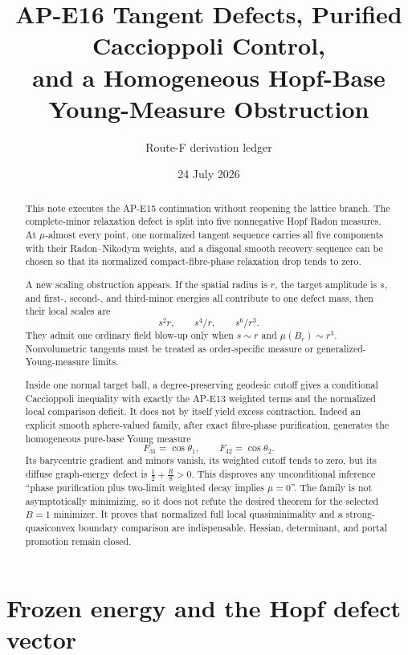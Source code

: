 \documentclass[10pt]{article}
\title{AP-E16 Tangent Defects, Purified Caccioppoli Control,\\
and a Homogeneous Hopf-Base Young-Measure Obstruction}
\author{Route-F derivation ledger}
\date{24 July 2026}
\begin{document}
\maketitle

\begin{abstract}
This note executes the AP-E15 continuation without reopening the lattice
branch.  The complete-minor relaxation defect is split into five nonnegative
Hopf Radon measures.  At $\mu$-almost every point, one normalized tangent
sequence carries all five components with their Radon--Nikodym weights, and a
diagonal smooth recovery sequence can be chosen so that its normalized
compact-fibre-phase relaxation drop tends to zero.

A new scaling obstruction appears.  If the spatial radius is $r$, the target
amplitude is $s$, and first-, second-, and third-minor energies all contribute
to one defect mass, then their local scales are
\[
 s^2r,\qquad s^4/r,\qquad s^6/r^3.
\]
They admit one ordinary field blow-up only when $s\sim r$ and
$\mu(B_r)\sim r^3$.  Nonvolumetric tangents must be treated as order-specific
measure or generalized-Young-measure limits.

Inside one normal target ball, a degree-preserving geodesic cutoff gives a
conditional Caccioppoli inequality with exactly the AP-E13 weighted terms and
the normalized local comparison deficit.  It does not by itself yield excess
contraction.  Indeed an explicit smooth sphere-valued family, after exact
fibre-phase purification, generates the homogeneous pure-base Young measure
\[
 F_{31}=\cos\theta_1,\qquad F_{42}=\cos\theta_2.
\]
Its barycentric gradient and minors vanish, its weighted cutoff tends to
zero, but its diffuse graph-energy defect is
$\frac12+\frac R8>0$.  This disproves any unconditional inference
``phase purification plus two-limit weighted decay implies $\mu=0$''.  The
family is not asymptotically minimizing, so it does not refute the desired
theorem for the selected $B=1$ minimizer.  It proves that normalized full
local quasiminimality and a strong-quasiconvex boundary comparison are
indispensable.  Hessian, determinant, and portal promotion remain closed.
\end{abstract}

\tableofcontents

\section{Frozen energy and the Hopf defect vector}
\end{document}
